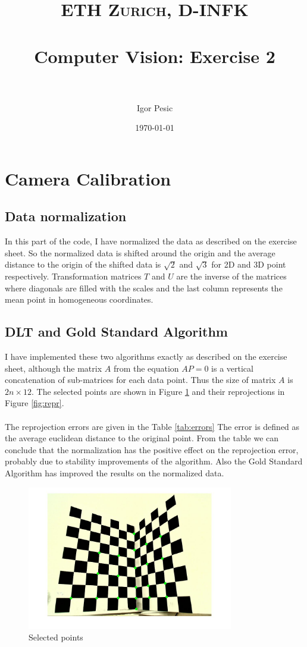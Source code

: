 \documentclass[paper=a4, fontsize=11pt]{scrartcl} %
\title{	
\normalfont \normalsize 
\textsc{ETH Zurich, D-INFK} \\ [25pt] %
\horrule{0.5pt} \\[0.4cm] %
\huge Computer Vision: Exercise 2 \\ %
\horrule{2pt} \\[0.5cm] %
}
\author{Igor Pesic} %
\date{\normalsize\today} %
\numberwithin{equation}{section} %
\numberwithin{figure}{section} %
\numberwithin{table}{section} %
\begin{document}
\maketitle %


\section{Camera Calibration}

\subsection{Data normalization}
In this part of the code, I have normalized the data as described on the exercise sheet. So the normalized data is shifted around the origin and the average distance to the origin of the shifted data is $\sqrt{2}$ and $\sqrt{3}$ for 2D and 3D point respectively. Transformation matrices $T$ and $U$ are the inverse of the matrices where diagonals are filled with the scales and the last column represents the mean point in homogeneous coordinates. 

\subsection{DLT and Gold Standard Algorithm}
I have implemented these two algorithms exactly as described on the exercise sheet, although the matrix $A$ from the equation $AP=0$ is a vertical concatenation of sub-matrices for each data point. Thus the size of matrix $A$ is $2n \times 12$. The selected points are shown in Figure \ref{fig:orig} and their reprojections in Figure \ref{fig:repr}.\\
\\
The reprojection errors are given in the Table \ref{tab:errors} The error is defined as the average euclidean distance to the original point. From the table we can conclude that the normalization has the positive effect on the reprojection error, probably due to stability improvements of the algorithm. Also the Gold Standard Algorithm has improved the results on the normalized data.

\begin{figure}
	\centering
  	\includegraphics[width=90mm]{data.jpg}
	\caption{Selected points}
	\label{fig:orig}
\end{figure}
\end{document}
